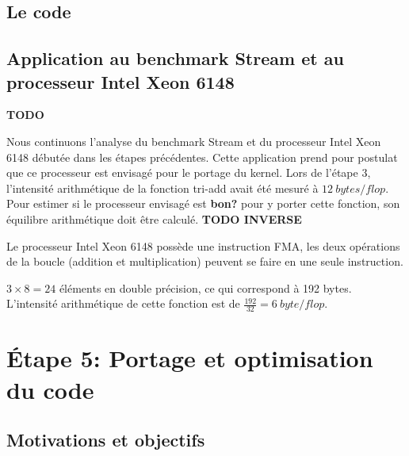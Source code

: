 \subsection{Le code}






\subsection{Application au benchmark Stream et au processeur Intel Xeon 6148}
 \textbf{TODO}

Nous continuons l'analyse du benchmark Stream et du processeur Intel Xeon 6148 débutée dans les étapes précédentes. Cette application prend pour postulat que ce processeur est envisagé pour le portage du kernel.
Lors de l'étape 3, l'intensité arithmétique de la fonction tri-add avait été mesuré à $12\ bytes/flop$. Pour estimer si le processeur envisagé est \textbf{bon?} pour y porter cette fonction, son équilibre arithmétique doit être calculé. \textbf{TODO INVERSE}

Le processeur Intel Xeon 6148 possède une instruction FMA, les deux opérations de la boucle (addition et multiplication) peuvent se faire en une seule instruction.

$3 \times 8 = 24$ éléments en double précision, ce qui correspond à 192 bytes. L'intensité arithmétique de cette fonction est de $ \frac{192}{32} = 6\ byte/flop$. 

\section{Étape 5: Portage et optimisation du code}


\subsection{Motivations et objectifs}

